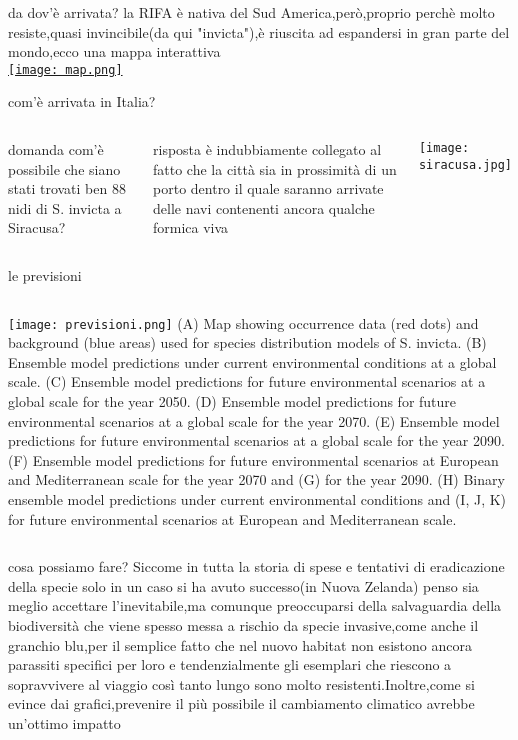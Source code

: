 \documentclass{beamer}
\begin{document}
\begin{frame}{da dov'è arrivata?}
    la RIFA è nativa del Sud America,però,proprio perchè molto resiste,quasi invincibile(da qui "invicta"),è riuscita ad espandersi in \alert{gran parte del mondo},ecco una mappa interattiva \\
    \href{https://antmaps.org/?mode=species&species=Solenopsis.invicta}{\texttt{[image: map.png]}} 
\end{frame}
\begin{frame}{com'è arrivata in Italia?}
\begin{columns}
      \begin{block}{domanda}
            com'è possibile che siano stati trovati ben 88 nidi di S. invicta a Siracusa?
    \end{block}
      \begin{alertblock}{risposta}
        è indubbiamente collegato al fatto che la città sia in prossimità di un porto dentro il quale saranno arrivate delle navi contenenti ancora qualche formica viva
    \end{alertblock}
    \texttt{[image: siracusa.jpg]}
\end{columns}
\end{frame}
  \begin{frame}{le previsioni}
      \begin{columns}
                \texttt{[image: previsioni.png]}
            {\tiny
            (A) Map showing occurrence data (red dots) and background (blue areas) used
for species distribution models of S. invicta. (B) Ensemble model predictions under current environmental conditions at a
global scale. (C) Ensemble model predictions for future environmental scenarios at a global scale for the year 2050. (D)
Ensemble model predictions for future environmental scenarios at a global scale for the year 2070. (E) Ensemble model
predictions for future environmental scenarios at a global scale for the year 2090. (F) Ensemble model predictions for future
environmental scenarios at European and Mediterranean scale for the year 2070 and (G) for the year 2090. (H) Binary
ensemble model predictions under current environmental conditions and (I, J, K) for future environmental scenarios at
European and Mediterranean scale.
}
      \end{columns}
  \end{frame}

\begin{frame}{cosa possiamo fare?}
    Siccome in tutta la storia di spese e tentativi di eradicazione della specie solo in un caso si ha avuto successo(in Nuova Zelanda) penso sia meglio accettare l'inevitabile,ma comunque preoccuparsi della \alert{salvaguardia della biodiversità} che viene spesso messa a rischio da specie invasive,come anche il granchio blu,per il semplice fatto che nel nuovo habitat non esistono ancora parassiti specifici per loro e tendenzialmente gli esemplari che riescono a sopravvivere al viaggio così tanto lungo sono molto resistenti.Inoltre,come si evince dai grafici,\alert{prevenire il più possibile il cambiamento climatico} avrebbe un'ottimo impatto 
\end{frame}
\end{document}
